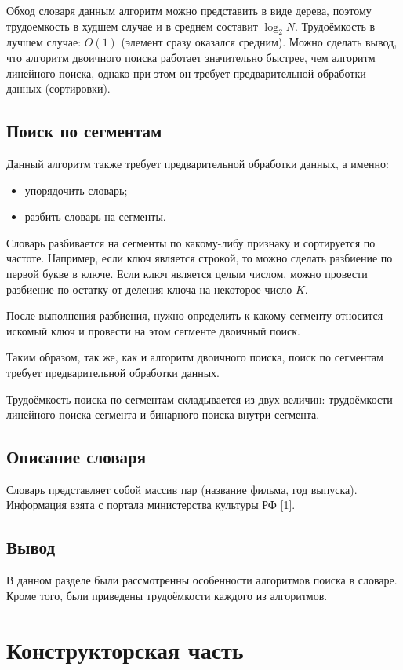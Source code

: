 \documentclass[12pt]{report}
\begin{document}
Обход словаря данным алгоритм можно представить в виде дерева, поэтому трудоемкость в худшем случае и в среднем составит $\log_{2}{N}$. Трудоёмкость в лучшем случае: $O(1)$ (элемент сразу оказался средним). Можно сделать вывод, что алгоритм двоичного поиска работает значительно быстрее, чем алгоритм линейного поиска, однако при этом он требует предварительной обработки данных (сортировки).
	
\section{Поиск по сегментам}
	
Данный алгоритм также требует предварительной обработки данных, а именно:
\begin{itemize}
	\item упорядочить словарь;
	\item разбить словарь на сегменты.
\end{itemize}
	
Словарь разбивается на сегменты по какому-либу признаку и сортируется по частоте. Например, если ключ является строкой, то можно сделать разбиение по первой букве в ключе. Если ключ является целым числом, можно провести разбиение по остатку от деления ключа на некоторое число $K$.
	
После выполнения разбиения, нужно определить к какому сегменту относится искомый ключ и провести на этом сегменте двоичный поиск.
	
Таким образом, так же, как и алгоритм двоичного поиска, поиск по сегментам требует предварительной обработки данных. 

Трудоёмкость поиска по сегментам складывается из двух величин: трудоёмкости линейного поиска сегмента и бинарного поиска внутри сегмента.
	
\section{Описание словаря}
Словарь представляет собой массив пар (название фильма, год выпуска). Информация взята с портала министерства культуры РФ [1].
	
\section*{Вывод}
В данном разделе были рассмотренны особенности алгоритмов поиска в словаре. Кроме того, бьли приведены трудоёмкости каждого из алгоритмов.
	
\chapter{Конструкторская часть}
	
\end{document}
